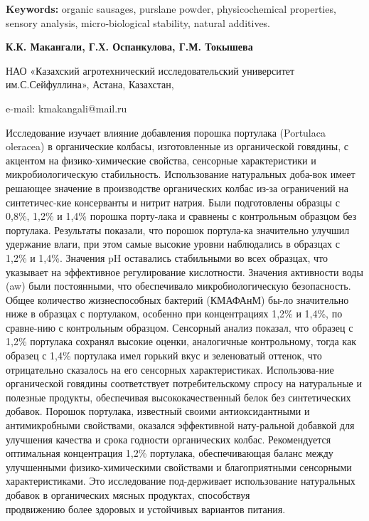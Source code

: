 {\bfseries Keywords:} organic sausages, purslane powder, physicochemical
properties, sensory analysis, micro-biological stability, natural
additives.

\begin{center}

{\bfseries К.К. Макангали\envelope, Г.Х. Оспанкулова, Г.М.
Токышева}

НАО «Казахский агротехнический исследовательский университет
им.С.Сейфуллина», Астана, Казахстан,

e-mail: kmakangali@mail.ru
\end{center}

Исследование изучает влияние добавления порошка портулака (Portulaca
oleracea) в органические колбасы, изготовленные из органической
говядины, с акцентом на физико-химические свойства, сенсорные
характеристики и микробиологическую стабильность. Использование
натуральных доба-вок имеет решающее значение в производстве органических
колбас из-за ограничений на синтетичес-кие консерванты и нитрит натрия.
Были подготовлены образцы с 0,8\%, 1,2\% и 1,4\% порошка порту-лака и
сравнены с контрольным образцом без портулака. Результаты показали, что
порошок портула-ка значительно улучшил удержание влаги, при этом самые
высокие уровни наблюдались в образцах с 1,2\% и 1,4\%. Значения pH
оставались стабильными во всех образцах, что указывает на эффективное
регулирование кислотности. Значения активности воды (aw) были
постоянными, что обеспечивало микробиологическую безопасность. Общее
количество жизнеспособных бактерий (КМАФАнМ) бы-ло значительно ниже в
образцах с портулаком, особенно при концентрациях 1,2\% и 1,4\%, по
сравне-нию с контрольным образцом. Сенсорный анализ показал, что образец
с 1,2\% портулака сохранял высокие оценки, аналогичные контрольному,
тогда как образец с 1,4\% портулака имел горький вкус и зеленоватый
оттенок, что отрицательно сказалось на его сенсорных характеристиках.
Использова-ние органической говядины соответствует потребительскому
спросу на натуральные и полезные продукты, обеспечивая
высококачественный белок без синтетических добавок. Порошок портулака,
известный своими антиоксидантными и антимикробными свойствами, оказался
эффективной нату-ральной добавкой для улучшения качества и срока годности
органических колбас. Рекомендуется оптимальная концентрация 1,2\%
портулака, обеспечивающая баланс между улучшенными физико-химическими
свойствами и благоприятными сенсорными характеристиками. Это
исследование под-держивает использование натуральных добавок в
органических мясных продуктах, способствуя \\продвижению более здоровых и
устойчивых вариантов питания.

